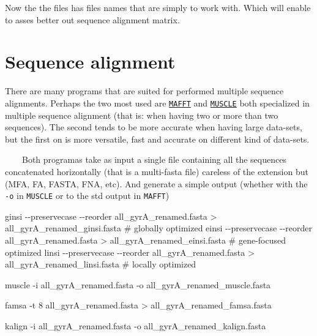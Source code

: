 \documentclass[
  letterpaper,
  DIV=11,
  numbers=noendperiod]{scrreprt}
\newenvironment{Shaded}{\begin{snugshade}}{\end{snugshade}}
\newcommand{\AttributeTok}[1]{\textcolor[rgb]{0.40,0.46,0.14}{#1}}
\newcommand{\CommentTok}[1]{\textcolor[rgb]{0.37,0.37,0.37}{#1}}
\newcommand{\ExtensionTok}[1]{\textcolor[rgb]{0.00,0.46,0.62}{#1}}
\newcommand{\NormalTok}[1]{\textcolor[rgb]{0.00,0.46,0.62}{#1}}
\newcommand{\OperatorTok}[1]{\textcolor[rgb]{0.37,0.37,0.37}{#1}}
\begin{document}
Now the the files has files names that are simply to work with. Which
will enable to asses better out sequence alignment matrix.

\hypertarget{sequence-alignment}{%
\section*{Sequence alignment}\label{sequence-alignment}}

There are many programs that are suited for performed multiple sequence
alignments. Perhaps the two most used are
\href{https://mafft.cbrc.jp/alignment/software/}{\texttt{MAFFT}} and
\href{https://drive5.com/muscle5/}{\texttt{MUSCLE}} both specialized in
multiple sequence alignment (that is: when having two or more than two
sequences). The second tends to be more accurate when having large
data-sets, but the first on is more versatile, fast and accurate on
different kind of data-sets.

~~~~Both programas take as input a single file containing all the
sequences concatenated horizontally (that is a multi-fasta file)
careless of the extension but (MFA, FA, FASTA, FNA, etc). And generate a
simple output (whether with the \texttt{-o} in \texttt{MUSCLE} or to the
std output in \texttt{MAFFT}) ~~~~

\begin{Shaded}
\begin{Highlighting}[]

\ExtensionTok{ginsi} \AttributeTok{{-}{-}preservecase} \AttributeTok{{-}{-}reorder}\NormalTok{ all\_gyrA\_renamed.fasta }\OperatorTok{\textgreater{}}\NormalTok{ all\_gyrA\_renamed\_ginsi.fasta }\CommentTok{\# globally optimized}
\ExtensionTok{einsi} \AttributeTok{{-}{-}preservecase} \AttributeTok{{-}{-}reorder}\NormalTok{ all\_gyrA\_renamed.fasta }\OperatorTok{\textgreater{}}\NormalTok{ all\_gyrA\_renamed\_einsi.fasta }\CommentTok{\# gene{-}focused optimized}
\ExtensionTok{linsi} \AttributeTok{{-}{-}preservecase} \AttributeTok{{-}{-}reorder}\NormalTok{ all\_gyrA\_renamed.fasta }\OperatorTok{\textgreater{}}\NormalTok{ all\_gyrA\_renamed\_linsi.fasta }\CommentTok{\# locally optimized}

\ExtensionTok{muscle} \AttributeTok{{-}i}\NormalTok{ all\_gyrA\_renamed.fasta }\AttributeTok{{-}o}\NormalTok{ all\_gyrA\_renamed\_muscle.fasta}

\ExtensionTok{famsa} \AttributeTok{{-}t}\NormalTok{ 8 all\_gyrA\_renamed.fasta }\OperatorTok{\textgreater{}}\NormalTok{ all\_gyrA\_renamed\_famsa.fasta}

\ExtensionTok{kalign} \AttributeTok{{-}i}\NormalTok{ all\_gyrA\_renamed.fasta }\AttributeTok{{-}o}\NormalTok{ all\_gyrA\_renamed\_kalign.fasta}
\end{Highlighting}
\end{Shaded}
\end{document}
